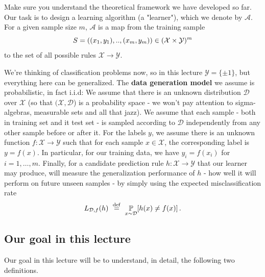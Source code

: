 \documentclass[11pt]{article}
\begin{document}
{Make sure you understand the theoretical framework we have developed so far. Our task is to design a learning algorithm (a "learner"), which we denote by $\mathcal{A}$. For a given sample size $m$, $\mathcal{A}$  is a map from the training sample 
\[S=((x_1,y_1),..,(x_m,y_m)) \in (\mathcal{X}\times \mathcal{Y})^m\]
to the set of all possible rules $\mathcal{X}\to\mathcal{Y}$. 

We're thinking of classification problems now, so in this lecture
$\mathcal{Y}=\{\pm 1\}$, but everything here can be generalized. The {\bf data
generation model} we assume is probabilistic, in fact i.i.d: We assume that
there is an unknown distribution $\mathcal{D}$ over $\mathcal{X}$ (so that
$(\mathcal{X},\mathcal{D}$) is a probability space - we won't pay attention to
sigma-algebras, measurable sets and all that jazz). We assume that each sample -
both in training set and it test set - is sampled according to $\mathcal{D}$
independently from any other sample before or after it. For the labels $y$, we assume there is an unknown function $f:\mathcal{X}\to\mathcal{Y}$ such that for each sample $x\in\mathcal{X}$, the corresponding label is $y=f(x)$.
In particular, for our training data, we have $y_i = f(x_i)$ for $i=1,\ldots,m$. Finally, for a candidate prediction rule $h:\mathcal{X}\to\mathcal{Y}$ that our learner may produce,  will measure the generalization performance of $h$ - how well it will perform on future unseen samples - by simply using the expected misclassification rate 
$$
L_{\mathcal{D},f}(h) ~\stackrel{\mathrm{def}}{=}~ \operatorname*{\mathbb{P}}_{x \sim \mathcal{D}}[h(x) \neq f(x)] \,.
$$

\subsection{Our goal in this lecture}

Our goal in this lecture will be to understand, in detail, the following two definitions.

}
\end{document}
